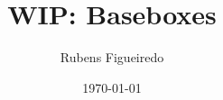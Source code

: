 \documentclass[11pt]{beamer}
\author{Rubens Figueiredo}
\title{WIP: Baseboxes}
\institute{BISDN GmbH}
\date{\today}
\begin{document}
\begin{frame}
\titlepage
\end{frame}





\end{document}
